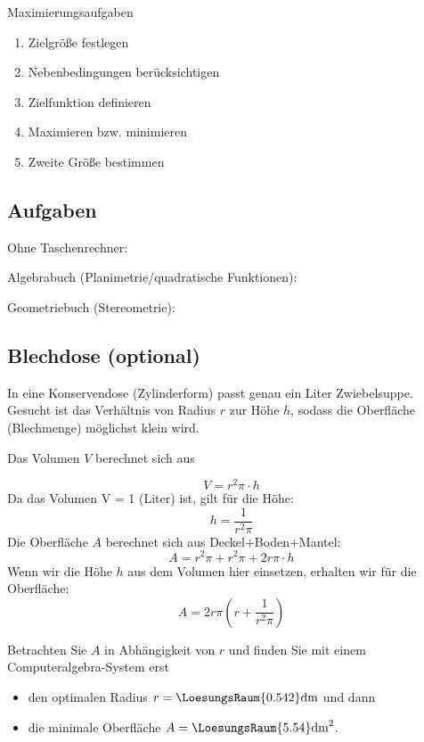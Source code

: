   
  \begin{rezept}{Maximierungsaufgaben}{}
    \begin{enumerate}
    \item Zielgröße festlegen
    \item Nebenbedingungen berücksichtigen
    \item Zielfunktion definieren
    \item Maximieren bzw. minimieren
    \item Zweite Größe bestimmen
      \end{enumerate}
\end{rezept}
  

\subsection*{Aufgaben}
Ohne Taschenrechner:

Algebrabuch (Planimetrie/quadratische Funktionen):


Geometriebuch (Stereometrie):

\newpage


\subsection{Blechdose (optional)}
In eine Konservendose (Zylinderform) passt genau ein Liter Zwiebelsuppe. Gesucht ist das Verhältnis von Radius $r$ zur Höhe $h$, sodass die Oberfläche (Blechmenge) möglichst klein wird.

Das Volumen $V$ berechnet sich aus

$$V = r^2\pi\cdot{}h$$
Da das Volumen V = 1 (Liter) ist, gilt für die Höhe:
$$h = \frac{1}{r^2\pi}$$
Die Oberfläche $A$ berechnet sich aus Deckel+Boden+Mantel:  
$$A=r^2\pi + r^2\pi + 2r\pi\cdot{}h$$
Wenn wir die Höhe $h$ aus dem Volumen hier einsetzen, erhalten wir für die Oberfläche:
$$A=2r\pi\left(r+\frac{1}{r^2\pi}\right)$$

Betrachten Sie $A$ in Abhängigkeit von $r$ und finden Sie mit einem
Computeralgebra-System erst
\begin{itemize}
\item
  den optimalen Radius $r=\LoesungsRaum{0.542}\textrm{dm}$ und dann
\item
  die minimale Oberfläche $A= \LoesungsRaum{5.54}\textrm{dm}^2$.
\end{itemize}
\newpage

